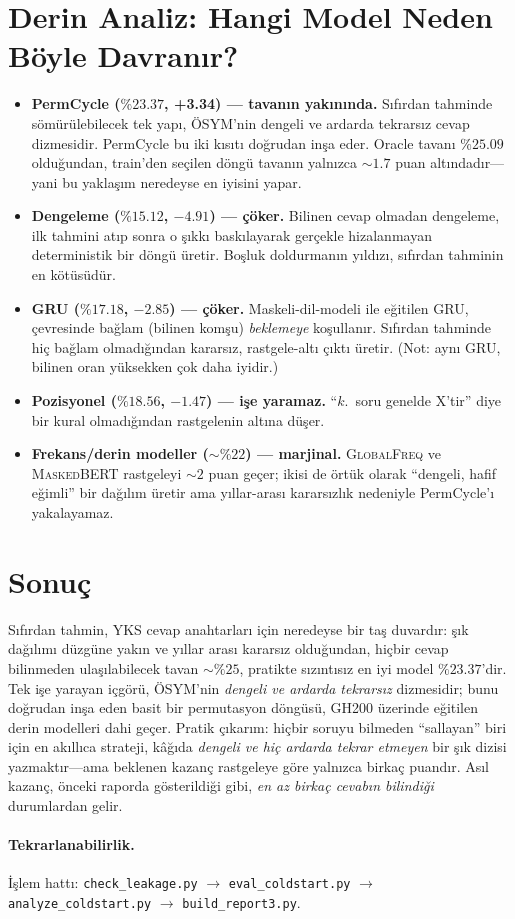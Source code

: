 \documentclass[11pt]{article}
\begin{document}
\section{Derin Analiz: Hangi Model Neden Böyle Davranır?}
\begin{itemize}
  \item \textbf{PermCycle ($\%23.37$, +3.34) --- tavanın yakınında.} Sıfırdan
  tahminde sömürülebilecek tek yapı, ÖSYM'nin dengeli ve ardarda tekrarsız
  cevap dizmesidir. PermCycle bu iki kısıtı doğrudan inşa eder. Oracle
  tavanı $\%25.09$ olduğundan, train'den seçilen döngü tavanın yalnızca
  $\sim 1.7$ puan altındadır---yani bu yaklaşım neredeyse en iyisini yapar.
  \item \textbf{Dengeleme ($\%15.12$, $-4.91$) --- çöker.} Bilinen cevap
  olmadan dengeleme, ilk tahmini atıp sonra o şıkkı baskılayarak gerçekle
  hizalanmayan deterministik bir döngü üretir. Boşluk doldurmanın yıldızı,
  sıfırdan tahminin en kötüsüdür.
  \item \textbf{GRU ($\%17.18$, $-2.85$) --- çöker.} Maskeli-dil-modeli ile
  eğitilen GRU, çevresinde bağlam (bilinen komşu) \emph{beklemeye} koşullanır.
  Sıfırdan tahminde hiç bağlam olmadığından kararsız, rastgele-altı çıktı
  üretir. (Not: aynı GRU, bilinen oran yüksekken çok daha iyidir.)
  \item \textbf{Pozisyonel ($\%18.56$, $-1.47$) --- işe yaramaz.} ``$k$.\ soru
  genelde X'tir'' diye bir kural olmadığından rastgelenin altına düşer.
  \item \textbf{Frekans/derin modeller ($\sim\%22$) --- marjinal.}
  \textsc{GlobalFreq} ve \textsc{MaskedBERT} rastgeleyi $\sim 2$ puan geçer;
  ikisi de örtük olarak ``dengeli, hafif eğimli'' bir dağılım üretir ama
  yıllar-arası kararsızlık nedeniyle PermCycle'ı yakalayamaz.
\end{itemize}

\section{Sonuç}
Sıfırdan tahmin, YKS cevap anahtarları için neredeyse bir taş duvardır: şık
dağılımı düzgüne yakın ve yıllar arası kararsız olduğundan, hiçbir cevap
bilinmeden ulaşılabilecek tavan $\sim\%25$, pratikte sızıntısız en iyi model
$\%23.37$'dir. Tek işe yarayan içgörü, ÖSYM'nin \emph{dengeli ve ardarda
tekrarsız} dizmesidir; bunu doğrudan inşa eden basit bir permutasyon döngüsü,
GH200 üzerinde eğitilen derin modelleri dahi geçer. Pratik çıkarım: hiçbir
soruyu bilmeden ``sallayan'' biri için en akıllıca strateji, kâğıda
\emph{dengeli ve hiç ardarda tekrar etmeyen} bir şık dizisi yazmaktır---ama
beklenen kazanç rastgeleye göre yalnızca birkaç puandır. Asıl kazanç, önceki
raporda gösterildiği gibi, \emph{en az birkaç cevabın bilindiği} durumlardan
gelir.

\paragraph{Tekrarlanabilirlik.} İşlem hattı: \texttt{check\_leakage.py}
$\rightarrow$ \texttt{eval\_coldstart.py} $\rightarrow$
\texttt{analyze\_coldstart.py} $\rightarrow$ \texttt{build\_report3.py}.
\end{document}
